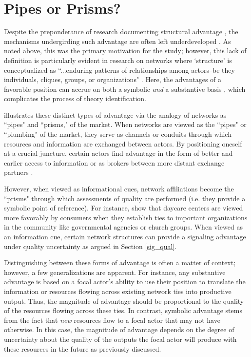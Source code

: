 \section{Pipes or Prisms? \label{pp}}

Despite the preponderance of research documenting structural advantage \citep[e.g.][]{benjamin1999, bothner2014, kim2014, podolny1993}, the mechanisms undergirding such advantage are often left underdeveloped \citep{jensen2011, podolny2001}. As noted above, this was the primary motivation for the \citet{malter2014} study; however, this lack of definition is particularly evident in research on networks where `structure' is conceptualized as ``...enduring patterns of relationships among actors--be they individuals, cliques, groups, or organizations" \citep[p. 2]{powell1999}. Here, the advantages of a favorable position can accrue on both a symbolic \emph{and} a substantive basis \citep[see e.g.][]{podolny2001}, which complicates the process of theory identification.

\citet{podolny2001} illustrates these distinct types of advantage via the analogy of networks as ``pipes" and ``prisms," of the market. When networks are viewed as the ``pipes" or ``plumbing" of the market, they serve as channels or conduits through which resources and information are exchanged between actors. By positioning oneself at a crucial juncture, certain actors find advantage in the form of better and earlier access to information \citep{powell1996} or as brokers between more distant exchange partners \citep{burt1992, webster1992}.

However, when viewed as informational cues, network affiliations become the ``prisms" through which assessments of quality are performed (i.e. they provide a symbolic point of reference). For instance, \citet{baum1992} show that daycare centers are viewed more favorably by consumers when they establish ties to important organizations in the community like governmental agencies or church groups. When viewed as an information cue, certain network structures can provide a signaling advantage under quality uncertainty as argued in Section \ref{sig_qual}.

Distinguishing between these forms of advantage is often a matter of context; however, a few generalizations are apparent. For instance, any substantive advantage is based on a focal actor's ability to use their position to translate the information or resources flowing across existing network ties into productive output. Thus, the magnitude of advantage should be proportional to the quality of the resources flowing across these ties. In contrast, symbolic advantage stems from the fact that \emph{new} resources flow to a focal actor that may not have otherwise. In this case, the magnitude of advantage depends on the degree of uncertainty about the quality of the outputs the focal actor will produce with these resources in the future as previously discussed.

